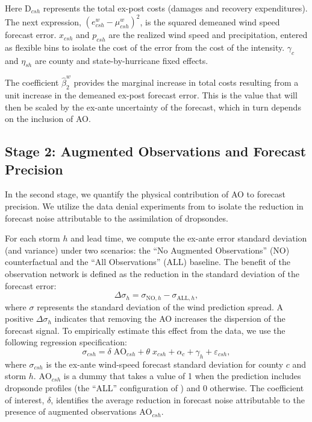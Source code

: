 \documentclass[12pt]{article}%
\begin{document}
Here $\text{D}_{csh}$ represents the total ex-post costs (damages and recovery expenditures). The next expression, $\left(e^w_{csh}-\mu^w_{csh}\right)^2$, is the squared demeaned wind speed forecast error. $x_{csh}$ and $p_{csh}$ are the realized wind speed and precipitation, entered as flexible bins to isolate the cost of the error from the cost of the intensity. $\gamma_{c}$ and $\eta_{sh}$ are county and state-by-hurricane fixed effects.

The coefficient $\hat{\beta}^w_2$ provides the marginal increase in total costs resulting from a unit increase in the demeaned ex-post forecast error. This is the value that will then be scaled by the ex-ante uncertainty of the forecast, which in turn depends on the inclusion of AO.

\subsection{Stage 2: Augmented Observations and Forecast Precision}

In the second stage, we quantify the physical contribution of AO to forecast precision. We utilize the data denial experiments from \citet{DitchekEA2023} to isolate the reduction in forecast noise attributable to the assimilation of dropsondes.

For each storm $h$ and lead time, we compute the ex-ante error standard deviation (and variance) under two scenarios: the ``No Augmented Observations'' ($\text{NO}$) counterfactual and the ``All Observations'' ($\text{ALL}$) baseline. The benefit of the observation network is defined as the reduction in the standard deviation of the forecast error:
\begin{equation}
    \Delta \sigma_{h} = \sigma_{\text{NO}, h} - \sigma_{\text{ALL}, h},
\end{equation}
\noindent where $\sigma$ represents the standard deviation of the wind prediction spread. A positive $\Delta \sigma_{h}$ indicates that removing the AO increases the dispersion of the forecast signal. To empirically estimate this effect from the data, we use the following regression specification:
\begin{equation}
   \sigma_{csh} = \delta \;\text{AO}_{csh} + \theta \;x_{csh} + \alpha_c + \gamma_h + \varepsilon_{csh},
\end{equation}
where $\sigma_{csh}$ is the ex-ante wind-speed forecast standard deviation for county $c$ and storm $h$. $\text{AO}_{csh}$ is a dummy that takes a value of 1 when the prediction includes dropsonde profiles (the ``ALL'' configuration of \citet{DitchekEA2023}) and 0 otherwise. The coefficient of interest, $\delta$, identifies the average reduction in forecast noise attributable to the presence of augmented observations $\text{AO}_{csh}$. 
\end{document}

